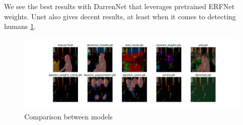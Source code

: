 We see the best results with DarrenNet that leverages pretrained ERFNet weights. Unet also
gives decent results, at least when it comes to detecting humans \ref{fig:comparison}.

\begin{figure}[H]
	\centering
	\includegraphics[width=\textwidth]{plots/comparison}
	\caption{Comparison between models}
	\label{fig:comparison}
\end{figure}
